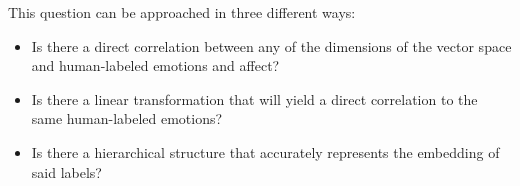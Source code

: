 This question can be approached in three different ways:
\begin{itemize}
  \item Is there a direct correlation between any of the dimensions of the vector space and human-labeled emotions and affect?
  \item Is there a linear transformation that will yield a direct correlation to the same human-labeled emotions?
  \item Is there a hierarchical structure that accurately represents the embedding of said labels?
\end{itemize}
